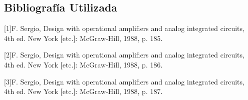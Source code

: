 \subsection{Bibliografía Utilizada}
[1]F. Sergio, Design with operational amplifiers and analog integrated circuits, 4th ed. New York [etc.]: McGraw-Hill, 1988, p. 185.

[2]F. Sergio, Design with operational amplifiers and analog integrated circuits, 4th ed. New York [etc.]: McGraw-Hill, 1988, p. 186.

[3]F. Sergio, Design with operational amplifiers and analog integrated circuits, 4th ed. New York [etc.]: McGraw-Hill, 1988, p. 187.



